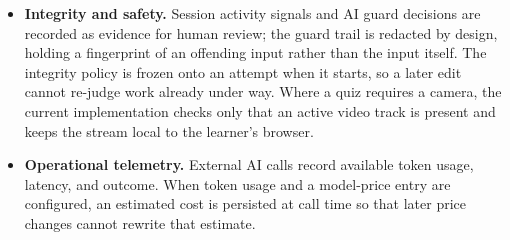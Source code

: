 \begin{itemize}
    \item \textbf{Integrity and safety.} Session activity signals and
    AI guard decisions are recorded as evidence for human review; the
    guard trail is redacted by design, holding a fingerprint of an
    offending input rather than the input itself. The integrity policy
    is frozen onto an attempt when it starts, so a later edit cannot
    re-judge work already under way. Where a quiz requires a camera,
    the current implementation checks only that an active video track
    is present and keeps the stream local to the learner's browser.

    \item \textbf{Operational telemetry.} External AI calls record
    available token usage, latency, and outcome. When token usage and a
    model-price entry are configured, an estimated cost is persisted at
    call time so that later price changes cannot rewrite that estimate.
\end{itemize}
